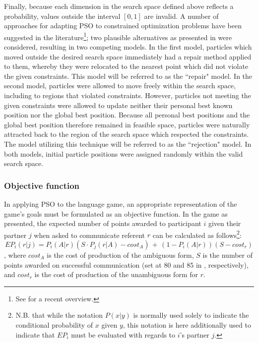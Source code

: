 \documentclass[12pt,a4paper]{article}
\begin{document}
Finally, because each dimension in the search space defined above reflects a probability, values outside the interval $[0, 1]$ are invalid. A number of approaches for adapting PSO to constrained optimization problems have been suggested in the literature\footnote{See \cite{helwig2010} for a recent overview.}; two plausible alternatives as presented in \cite{engelbrecht2005} were considered, resulting in two competing models. 
In the first model, particles which moved outside the desired search space immediately had a repair method applied to them, whereby they were relocated to the nearest point which did not violate the given constraints. This model will be referred to as the ``repair" model. In the second model, particles were allowed to move freely within the search space, including to regions that violated constraints. However, particles not meeting the given constraints were allowed to update neither their personal best known position nor the global best position. Because all personal best positions and the global best position therefore remained in feasible space, particles were naturally attracted back to the region of the search space which respected the constraints. The model utilizing this technique will be referred to as the ``rejection" model. In both models, initial particle positions were assigned randomly within the valid search space.


 
\subsubsection{Objective function}
\label{sec:objective_func}
In applying PSO to the \citeauthor{rohde2012} language game, an appropriate representation of the game's goals must be formulated as an objective function. In the game as presented, the expected number of points awarded to participant $i$ given their partner $j$ when asked to communicate referent $r$ can be calculated as follows\footnote{N.B. that while the notation $P(x|y)$ is normally used solely to indicate the conditional probability of $x$ given $y$, this notation is here additionally used to indicate that $EP_i$ must be evaluated with regards to $i$'s partner $j$.}:
\begin{equation}
EP_{i}(r|j) = P_i(A|r)(S \cdot P_j(r|A) - cost_A) \,+\, (1 - P_i(A|r))(S - cost_r) 
\end{equation},
where $cost_A$ is the cost of production of the ambiguous form, $S$ is the number of points awarded on successful communication (set at 80 and 85 in \citeauthor{rohde2012}, respectively), and $cost_r$ is the cost of production of the unambiguous form for $r$.
\end{document}
